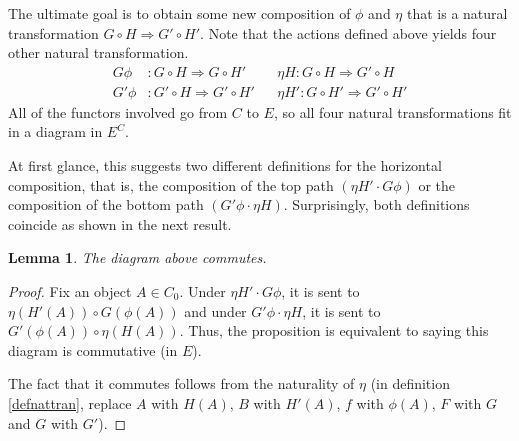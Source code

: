 \documentclass{article}
\newtheorem{lem}[thm]{Lemma}
\theoremstyle{definition}
\theoremstyle{remark}
\begin{document}
The ultimate goal is to obtain some new composition of $\phi$ and $\eta$ that is a natural transformation $G\circ H \Rightarrow G'\circ H'$. Note that the actions defined above yields four other natural transformation.
\begin{align*}
	G\phi&: G\circ H \Rightarrow G\circ H' &&\eta H: G\circ H \Rightarrow G'\circ H \\
	G'\phi&: G'\circ H \Rightarrow G'\circ H'&&\eta H': G\circ H' \Rightarrow G'\circ H'
\end{align*}
All of the functors involved go from $C$ to $E$, so all four natural transformations fit in a diagram in $E^C$.
\begin{figure}[h]
	\centering
\end{figure}

At first glance, this suggests two different definitions for the horizontal composition, that is, the composition of the top path $(\eta H' \cdot G\phi)$ or the composition of the bottom path $(G'\phi \cdot \eta H)$. Surprisingly, both definitions coincide as shown in the next result.

\begin{lem}
	The diagram above commutes.
\end{lem}
\begin{proof}
Fix an object $A \in C_0$. Under $\eta H' \cdot G\phi$, it is sent to $\eta(H'(A)) \circ G(\phi(A))$ and under $G'\phi \cdot \eta H$, it is sent to $G'(\phi(A)) \circ \eta(H(A))$. Thus, the proposition is equivalent to saying this diagram is commutative (in $E$).
\begin{figure}[h]
	\centering
\end{figure}

The fact that it commutes follows from the naturality of $\eta$ (in definition \ref{defnattran}, replace $A$ with $H(A)$, $B$ with $H'(A)$, $f$ with $\phi(A)$, $F$ with $G$ and $G$ with $G'$).
\end{proof}
\end{document}
